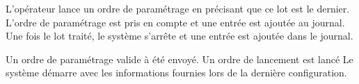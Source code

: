 {L'opérateur lance un ordre de paramétrage en précisant que ce lot est le dernier.}
{L'ordre de paramétrage est pris en compte et une entrée est ajoutée au journal. Une fois le lot traité, le système s'arrête et une entrée est ajoutée dans le journal.}

{Un ordre de paramétrage valide à été envoyé. Un ordre de lancement est lancé}
{Le système démarre avec les informations fournies lors de la dernière configuration.}
